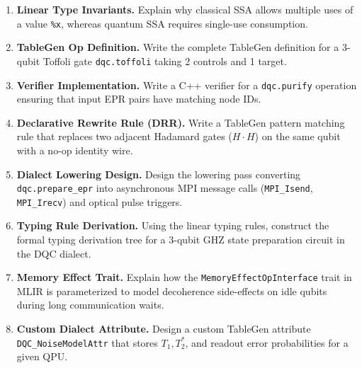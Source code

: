 \begin{enumerate}[label=\textbf{7.\arabic*.}]
    \item \textbf{Linear Type Invariants.} Explain why classical SSA allows multiple uses of a value \texttt{\%x}, whereas quantum SSA requires single-use consumption.
    \item \textbf{TableGen Op Definition.} Write the complete TableGen definition for a 3-qubit Toffoli gate \texttt{dqc.toffoli} taking 2 controls and 1 target.
    \item \textbf{Verifier Implementation.} Write a C++ verifier for a \texttt{dqc.purify} operation ensuring that input EPR pairs have matching node IDs.
    \item \textbf{Declarative Rewrite Rule (DRR).} Write a TableGen pattern matching rule that replaces two adjacent Hadamard gates ($H \cdot H$) on the same qubit with a no-op identity wire.
    \item \textbf{Dialect Lowering Design.} Design the lowering pass converting \texttt{dqc.prepare\_epr} into asynchronous MPI message calls (\texttt{MPI\_Isend}, \texttt{MPI\_Irecv}) and optical pulse triggers.
    \item \textbf{Typing Rule Derivation.} Using the linear typing rules, construct the formal typing derivation tree for a 3-qubit GHZ state preparation circuit in the DQC dialect.
    \item \textbf{Memory Effect Trait.} Explain how the \texttt{MemoryEffectOpInterface} trait in MLIR is parameterized to model decoherence side-effects on idle qubits during long communication waits.
    \item \textbf{Custom Dialect Attribute.} Design a custom TableGen attribute \texttt{DQC\_NoiseModelAttr} that stores $T_1, T_2^*$, and readout error probabilities for a given QPU.
\end{enumerate}
